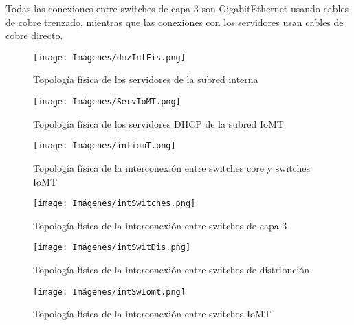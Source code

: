 Todas las conexiones entre switches de capa 3 son GigabitEthernet usando cables de cobre trenzado, mientras que las conexiones con los servidores usan cables de cobre directo.
\begin{figure}[H]
    \centering
    \texttt{[image: Imágenes/dmzIntFis.png]}
    \caption{Topología física de los servidores de la subred interna}
    \label{fig:servInt} 
\end{figure}
\begin{figure}[H]
    \centering
    \texttt{[image: Imágenes/ServIoMT.png]}
    \caption{Topología física de los servidores DHCP de la subred IoMT}
    \label{fig:servIomT} 
\end{figure}
\begin{figure}[H]
    \centering
    \texttt{[image: Imágenes/intiomT.png]}
    \caption{Topología física de la interconexión entre switches core y switches IoMT}
    \label{fig:intIomt} 
\end{figure}
\begin{figure}[H]
    \centering
    \texttt{[image: Imágenes/intSwitches.png]}
    \caption{Topología física de la interconexión entre switches de capa 3}
    \label{fig:intSwitch} 
\end{figure}
\begin{figure}[H]
    \centering
    \texttt{[image: Imágenes/intSwitDis.png]}
    \caption{Topología física de la interconexión entre switches de distribución}
    \label{fig:intSwitchDis} 
\end{figure}
\begin{figure}[H]
    \centering
    \texttt{[image: Imágenes/intSwIomt.png]}
    \caption{Topología física de la interconexión entre switches IoMT}
    \label{fig:intSwitchiomt} 
\end{figure}

